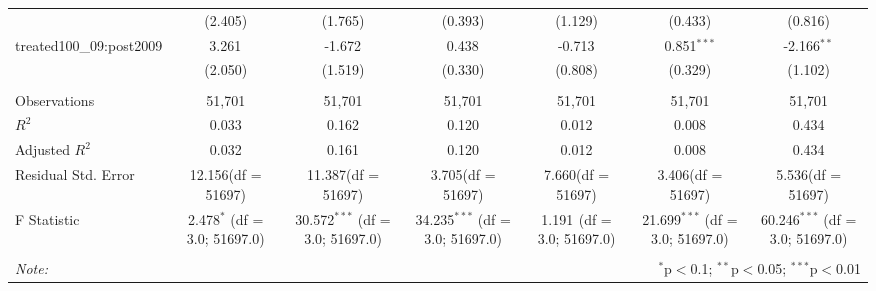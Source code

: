 \documentclass[12pt]{article}
\begin{document}
\begin{table}[!htbp]
\begin{tabular}{@{\extracolsep{5pt}}lcccccc}
  & (2.405) & (1.765) & (0.393) & (1.129) & (0.433) & (0.816) \\
 treated100_09:post2009 & 3.261$^{}$ & -1.672$^{}$ & 0.438$^{}$ & -0.713$^{}$ & 0.851$^{***}$ & -2.166$^{**}$ \\
  & (2.050) & (1.519) & (0.330) & (0.808) & (0.329) & (1.102) \\
\hline \\[-1.8ex]
 Observations & 51,701 & 51,701 & 51,701 & 51,701 & 51,701 & 51,701 \\
 $R^2$ & 0.033 & 0.162 & 0.120 & 0.012 & 0.008 & 0.434 \\
 Adjusted $R^2$ & 0.032 & 0.161 & 0.120 & 0.012 & 0.008 & 0.434 \\
 Residual Std. Error & 12.156(df = 51697) & 11.387(df = 51697) & 3.705(df = 51697) & 7.660(df = 51697) & 3.406(df = 51697) & 5.536(df = 51697)  \\
 F Statistic & 2.478$^{*}$ (df = 3.0; 51697.0) & 30.572$^{***}$ (df = 3.0; 51697.0) & 34.235$^{***}$ (df = 3.0; 51697.0) & 1.191$^{}$ (df = 3.0; 51697.0) & 21.699$^{***}$ (df = 3.0; 51697.0) & 60.246$^{***}$ (df = 3.0; 51697.0) \\
\hline
\hline \\[-1.8ex]
\textit{Note:} & \multicolumn{6}{r}{$^{*}$p$<$0.1; $^{**}$p$<$0.05; $^{***}$p$<$0.01} \\
\end{tabular}
\end{table}
\end{document}
